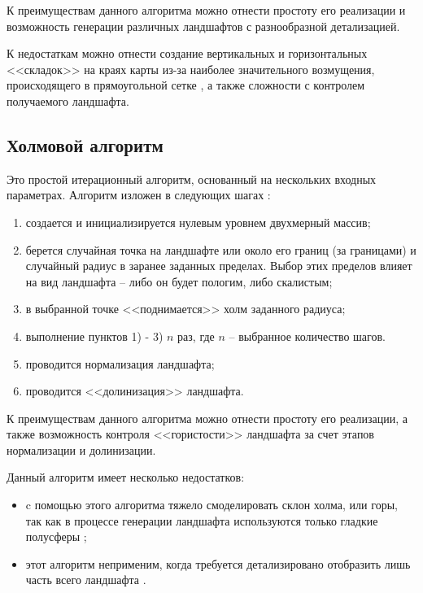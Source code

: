 К преимуществам данного алгоритма можно отнести простоту его реализации и возможность генерации различных ландшафтов с разнообразной детализацией.

К недостаткам можно отнести создание вертикальных и горизонтальных <<складок>> на краях карты из-за наиболее значительного возмущения, происходящего в прямоугольной сетке \cite{info_diaSquWiki}, а также сложности с контролем получаемого ландшафта.

\subsection{Холмовой алгоритм}

Это простой итерационный алгоритм, основанный на нескольких входных параметрах. Алгоритм изложен в следующих шагах \cite{info_hillAlg}:

\begin{enumerate}[label={\arabic*)}]
	\item создается и инициализируется нулевым уровнем двухмерный массив;
	\item берется случайная точка на ландшафте или около его границ (за границами) и случайный радиус в заранее заданных пределах. Выбор этих пределов влияет на вид ландшафта -- либо он будет пологим, либо скалистым; 
	\item в выбранной точке <<поднимается>> холм заданного радиуса;
	\item выполнение пунктов 1) - 3) $n$ раз, где $n$ -- выбранное количество шагов.
	\item проводится нормализация ландшафта;
	\item проводится <<долинизация>> ландшафта.
\end{enumerate}

К преимуществам данного алгоритма можно отнести простоту его реализации, а также возможность контроля <<гористости>> ландшафта за счет этапов нормализации и долинизации.

Данный алгоритм имеет несколько недостатков:

\begin{itemize}[label=--]
	\item c помощью этого алгоритма тяжело смоделировать склон холма, или
	горы, так как в процессе генерации ландшафта используются только
	гладкие полусферы \cite{info_hillAlgFlaws};
	\item этот алгоритм неприменим, когда требуется детализировано
	отобразить лишь часть всего ландшафта \cite{info_hillAlgFlaws}.
\end{itemize}

